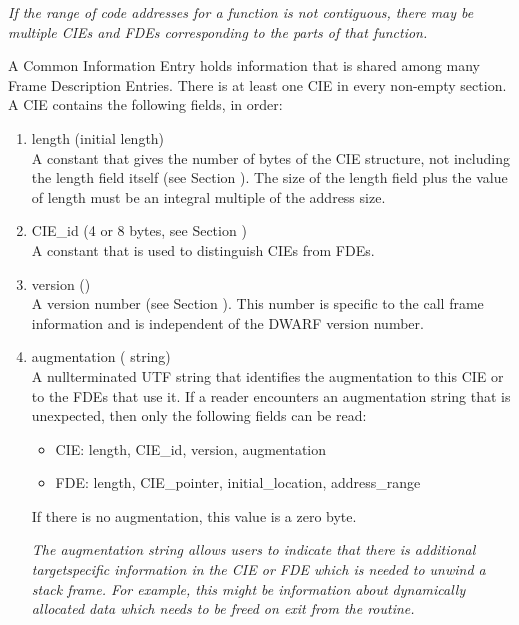 \textit{If the range of code addresses for a function is not
contiguous, there may be multiple CIEs and FDEs corresponding
to the parts of that function.}


A Common Information Entry holds information that is shared
among many Frame Description Entries. There is at least one
CIE in every non-empty  section. A CIE contains
the following fields, in order:
\begin{enumerate}[1. ]
\item length (initial length)  \\
A constant that gives the number of bytes of the CIE structure,
not including the length field itself 
(see Section ). 
The
size of the length field plus the value of length must be an
integral multiple of the address size.

\item  CIE\_id (4 or 8 bytes, see Section ) \\
A constant that is used to distinguish CIEs from FDEs.

\item  version () \\
A version number 
(see Section ). 
This number is specific to the call frame information
and is independent of the DWARF version number.


\item  augmentation ( string) \\
A null\dash terminated UTF string that identifies the augmentation
to this CIE or to the FDEs that use it. If a reader encounters
an augmentation string that is unexpected, then only the
following fields can be read:


\begin{itemize}

\item CIE: length, CIE\_id, version, augmentation

\item FDE: length, CIE\_pointer, initial\_location, address\_range

\end{itemize}
If there is no augmentation, this value is a zero byte.

\textit{The augmentation string allows users to indicate that there
is additional target\dash specific information in the CIE or FDE
which is needed to unwind a stack frame. For example, this
might be information about dynamically allocated data which
needs to be freed on exit from the routine.}


\end{enumerate}

